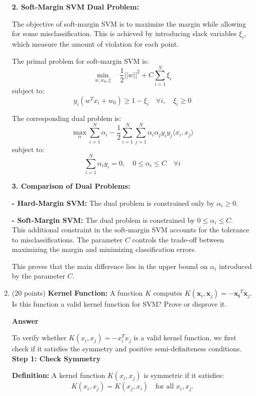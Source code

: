 \documentclass[11pt]{article}
\begin{document}
\begin{enumerate}
\textbf{2. Soft-Margin SVM Dual Problem:}

The objective of soft-margin SVM is to maximize the margin while allowing for some misclassification. This is achieved by introducing slack variables \( \xi_i \), which measure the amount of violation for each point.

The primal problem for soft-margin SVM is:
\[
\min_{w, w_0, \xi} \quad \frac{1}{2} ||w||^2 + C \sum_{i=1}^N \xi_i
\]
subject to:
\[
y_i(w^T x_i + w_0) \geq 1 - \xi_i \quad \forall i, \quad \xi_i \geq 0
\]

The corresponding dual problem is:
\[
\max_{\alpha} \sum_{i=1}^N \alpha_i - \frac{1}{2} \sum_{i=1}^N \sum_{j=1}^N \alpha_i \alpha_j y_i y_j \langle x_i, x_j \rangle
\]
subject to:
\[
\sum_{i=1}^N \alpha_i y_i = 0, \quad 0 \leq \alpha_i \leq C \quad \forall i
\]

\textbf{3. Comparison of Dual Problems:}


\textbf{- Hard-Margin SVM:} The dual problem is constrained only by \( \alpha_i \geq 0 \).

\textbf{- Soft-Margin SVM:} The dual problem is constrained by \( 0 \leq \alpha_i \leq C\).\\

This additional constraint in the soft-margin SVM accounts for the tolerance to misclassifications. The parameter \( C \) controls the trade-off between maximizing the margin and minimizing classification errors.

This proves that the main difference lies in the upper bound on \( \alpha_i \) introduced by the parameter \( C \).

\item (20 points) \textbf{Kernel Function:} A function $K$
computes $K(\boldsymbol x_i, \boldsymbol x_j) =
-\boldsymbol{x_i}^T \boldsymbol x_j $. Is this function a valid
kernel function for SVM? Prove or disprove it.

\textbf{Answer}

To verify whether \( K(x_i, x_j) = -x_i^T x_j \) is a valid kernel function, we first check if it satisfies the symmetry and positive semi-definiteness conditions.\\

\textbf{Step 1: Check Symmetry}



\textbf{Definition:} A kernel function \( K(x_i, x_j) \) is symmetric if it satisfies:
   \[
   K(x_i, x_j) = K(x_j, x_i) \quad \text{for all } x_i, x_j.
   \]


\end{enumerate}
\end{document}
